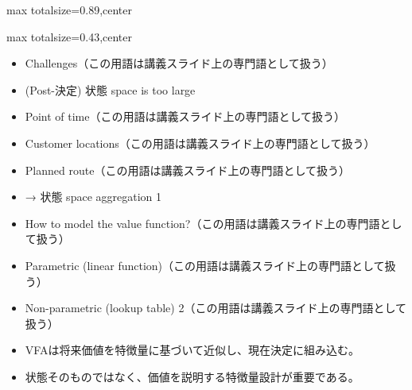 \begin{minipage}[t]{0.58\textwidth}
\begin{adjustbox}{max totalsize={\textwidth}{0.89\textheight},center}
\begin{minipage}{\textwidth}
\end{minipage}
\end{adjustbox}
\end{minipage}


\clearpage
{}
\begin{minipage}[t]{0.405\textwidth}
\begin{adjustbox}{max totalsize={\textwidth}{0.43\textheight},center}
\begin{minipage}{\textwidth}\scriptsize
{}\begin{itemize}
\item Challenges（この用語は講義スライド上の専門語として扱う）
\item (Post-決定) 状態 space is too large
\item Point of time（この用語は講義スライド上の専門語として扱う）
\item Customer locations（この用語は講義スライド上の専門語として扱う）
\item Planned route（この用語は講義スライド上の専門語として扱う）
\item → 状態 space aggregation 1
\item How to model the value function?（この用語は講義スライド上の専門語として扱う）
\item Parametric (linear function)（この用語は講義スライド上の専門語として扱う）
\item Non-parametric (lookup table) 2（この用語は講義スライド上の専門語として扱う）
\end{itemize}\begin{itemize}
\item VFAは将来価値を特徴量に基づいて近似し、現在決定に組み込む。
\item 状態そのものではなく、価値を説明する特徴量設計が重要である。
\end{itemize}
\end{minipage}
\end{adjustbox}
\end{minipage}\hfill

